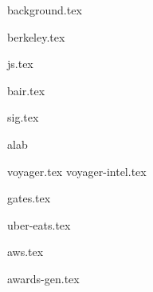 \documentclass[11pt]{article}
\begin{document}
{background.tex}


{berkeley.tex}


{js.tex}

{bair.tex}

{sig.tex}

{alab}

{voyager.tex}
{voyager-intel.tex}

{gates.tex}

{uber-eats.tex}

{aws.tex}


{awards-gen.tex}
\end{document}
